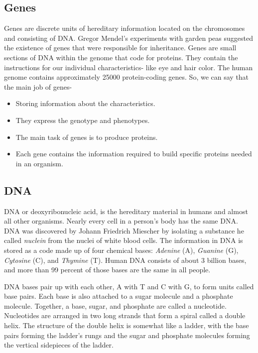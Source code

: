 \subsection{Genes}
Genes are discrete units of hereditary information located on the chromosomes and consisting of DNA. Gregor Mendel's experiments with garden peas suggested the existence of genes that were responsible for inheritance. Genes are small sections of DNA within the genome that code for proteins. They contain the instructions for our individual characteristics- like eye and hair color. 
The human genome contains approximately 25000 protein-coding genes.
So, we can say that the main job of genes-
\begin{itemize}
	\item Storing information about the characteristics. 
	\item They express the genotype and phenotypes.
	\item The main task of genes is to produce proteins.
	\item Each gene contains the information required to build specific proteins needed in an organism.
\end{itemize}
 
\subsection{DNA}
DNA or deoxyribonucleic acid, is the hereditary material in humans and almost all other organisms. Nearly every cell in a person’s body has the same DNA. DNA was discovered by Johann Friedrich Miescher by isolating a substance he called \textit{nuclein} from the nuclei of white blood cells. The information in DNA is stored as a code made up of four chemical bases: \textit{Adenine} (A), \textit{Guanine} (G), \textit{Cytosine} (C), and \textit{Thymine} (T). Human DNA consists of about 3 billion bases, and more than 99 percent of those bases are the same in all people.

DNA bases pair up with each other, A with T and C with G, to form units called base pairs. Each base is also attached to a sugar molecule and a phosphate molecule. Together, a base, sugar, and phosphate are called a nucleotide. Nucleotides are arranged in two long strands that form a spiral called a double helix. The structure of the double helix is somewhat like a ladder, with the base pairs forming the ladder's rungs and the sugar and phosphate molecules forming the vertical sidepieces of the ladder.

